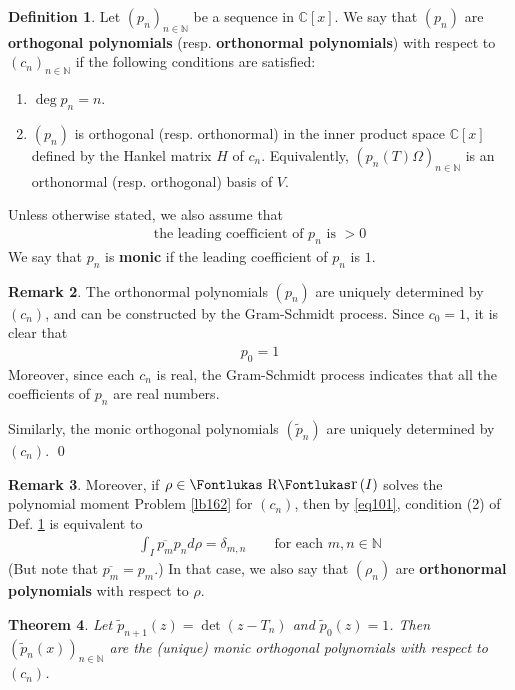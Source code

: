 \documentclass[12pt,b5paper,notitlepage]{article}
\theoremstyle{definition}
\newtheorem{df}{Definition}[subsection]
\newtheorem{rem}[df]{Remark}
\theoremstyle{plain}
\newtheorem{thm}[df]{Theorem}
\DeclareMathOperator{\Rr}{\text{\Fontlukas R}\text{\kern -0pt {\Fontlukas\large r}}\,}
\newcommand{\wtd}{\widetilde}
\newcommand{\ovl}{\overline}
\newcommand{\Cbb}{\mathbb C}
\newcommand{\Nbb}{\mathbb N}
\numberwithin{equation}{section}
\begin{document}
\begin{df}\label{lb190}
Let $(p_n)_{n\in\Nbb}$ be a sequence in $\Cbb[x]$. We say that $(p_n)$ are \textbf{orthogonal polynomials} (resp. \textbf{orthonormal polynomials})  with respect to $(c_n)_{n\in\Nbb}$ if the following conditions are satisfied:
\begin{enumerate}[label=(\arabic*)]
\item $\deg p_n=n$.
\item $(p_n)$ is orthogonal (resp. orthonormal) in the inner product space $\Cbb[x]$ defined by the Hankel matrix $H$ of $c_n$. Equivalently, $(p_n(T)\Omega)_{n\in\Nbb}$ is an orthonormal (resp. orthogonal) basis of $V$.
\end{enumerate}
Unless otherwise stated, we also assume that
\begin{align}
\text{the leading coefficient of $p_n$ is $>0$}
\end{align}
We say that $p_n$ is \textbf{monic} if the leading coefficient of $p_n$ is $1$.
\end{df}

\begin{rem}
The orthonormal polynomials $(p_n)$ are uniquely determined by $(c_n)$, and can be constructed by the Gram-Schmidt process. Since $c_0=1$, it is clear that
\begin{align*}
p_0=1
\end{align*}
Moreover, since each $c_n$ is real, the Gram-Schmidt process indicates that all the coefficients of $p_n$ are real numbers.

Similarly, the monic orthogonal polynomials $(\wtd p_n)$ are uniquely determined by $(c_n)$.   \hfill\qed
\end{rem}


\begin{rem}
Moreover, if $\rho\in\Rr(I)$ solves the polynomial moment Problem \ref{lb162} for $(c_n)$, then by \eqref{eq101}, condition (2) of Def. \ref{lb190} is equivalent to
\begin{align}
\int_I \ovl{p_m}p_n d\rho=\delta_{m,n}\qquad\text{for each }m,n\in\Nbb
\end{align}
(But note that $\ovl{p_m}=p_m$.) In that case, we also say that $(\rho_n)$ are \textbf{orthonormal polynomials} with respect to $\rho$.
\end{rem}



\begin{thm}\label{lb196}
Let $\wtd p_{n+1}(z)=\det(z-T_n)$ and $\wtd p_0(z)=1$. Then $(\wtd p_n(x))_{n\in\Nbb}$ are the (unique) monic orthogonal polynomials with respect to $(c_n)$.
\end{thm}
\end{document}
